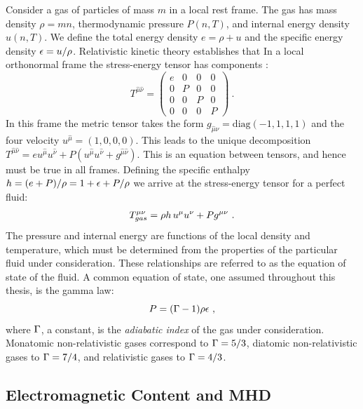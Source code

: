   Consider a gas of particles of mass $m$ in a local rest frame. The gas has mass density $\rho = m n$, thermodynamic pressure $P(n,T)$, and internal energy density $u(n,T)$.  We define the total energy density $e = \rho + u$ and the specific energy density $\epsilon = u / \rho$.  Relativistic kinetic theory establishes that In a local orthonormal frame the stress-energy tensor has components \citep{RezzollaZanotti}:
  \begin{equation}
  	T^{\hat{\mu}\hat{\nu}} = \begin{pmatrix} e & 0 & 0 & 0 \\
									0 & P & 0 & 0 \\
									0 & 0 & P & 0 \\
									0 & 0 & 0 & P \end{pmatrix}\ .
  \end{equation}
In this frame the metric tensor takes the form $g_{\hat{\mu}\hat{\nu}} = \text{diag}(-1,1,1,1)$ and the four velocity $u^{\hat{\mu}}  = (1,0,0,0)$.  This leads to the unique decomposition $T^{\hat{\mu}\hat{\nu}} = e u^{\hat{\mu}}u^{\hat{\nu}} + P ( u^{\hat{\mu}}u^{\hat{\nu}} + g^{\hat{\mu}\hat{\nu}})$.  This is an equation between tensors, and hence must be true in all frames. Defining the specific enthalpy $h = (e+P)/\rho = 1 + \epsilon + P/\rho$ we arrive at the stress-energy tensor for a perfect fluid:
\begin{equation}
	T^{\mu\nu}_{gas} = \rho h \ \! u^\mu u^\nu + P g^{\mu\nu} \eqlabel{defTgas}\ .
\end{equation}
The pressure and internal energy are functions of the local density and temperature, which must be determined from the properties of the particular fluid under consideration.  These relationships are referred to as the equation of state of the fluid.  A common equation of state, one assumed throughout this thesis, is the gamma law:
\begin{equation}
	P = (\Gamma - 1)\rho \eps \ , \eqlabel{gammalaw}
\end{equation}
where $\Gamma$, a constant, is the \emph{adiabatic index} of the gas under consideration.  Monatomic non-relativistic gases correspond to $\Gamma=5/3$, diatomic non-relativistic gases to $\Gamma=7/4$, and relativistic gases to $\Gamma=4/3$.

\subsection{Electromagnetic Content and MHD}

